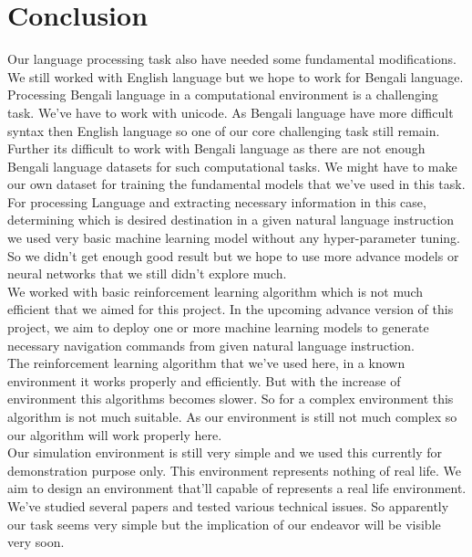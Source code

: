 \chapter{Conclusion}
Our language processing task also have needed some fundamental modifications. We still worked with English language but we hope to work for Bengali language. Processing Bengali language in a computational environment is a challenging task. We've have to work with unicode. As Bengali language have more difficult syntax then English language so one of our core challenging task still remain.\\

Further its difficult to work with Bengali language as there are not enough Bengali language datasets for such computational tasks. We might have to make our own dataset for training the fundamental models that we've used in this task.\\

For processing Language and extracting necessary information in this case, determining which is desired destination in a given natural language instruction we used very basic machine learning model without any hyper-parameter tuning. So we didn't get enough good result but we hope to use more advance models or neural networks that we still didn't explore much.\\

We worked with basic reinforcement learning algorithm which is not much efficient that we aimed for this project. In the upcoming advance version of this project, we aim to deploy one or more machine learning models to generate necessary navigation commands from given natural language instruction.\\

The reinforcement learning algorithm that we've used here, in a known environment it works properly and efficiently. But with the increase of environment this algorithms becomes slower. So for a complex environment this algorithm is not much suitable. As our environment is still not much complex so our algorithm will work properly here.\\

Our simulation environment is still very simple and we used this currently for demonstration purpose only. This environment represents nothing of real life. We aim to design an environment that'll capable of represents a real life environment.\\

We've studied several papers and tested various technical issues. So apparently our task seems very simple but the implication of our endeavor will be visible very soon.	  
	
